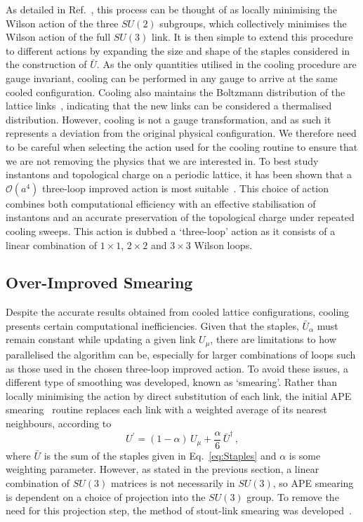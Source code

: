 As detailed in Ref.~\cite{Bonnet:2000dc}, this process can be thought of as locally minimising the Wilson action of the three $SU(2)$ subgroups, which collectively minimises the Wilson action of the full $SU(3)$ link. It is then simple to extend this procedure to different actions by expanding the size and shape of the staples considered in the construction of $\bar{U}$. As the only quantities utilised in the cooling procedure are gauge invariant, cooling can be performed in any gauge to arrive at the same cooled configuration. Cooling also maintains the Boltzmann distribution of the lattice links~\cite{Cabibbo:1982zn}, indicating that the new links can be considered a thermalised distribution. However, cooling is not a gauge transformation, and as such it represents a deviation from the original physical configuration. We therefore need to be careful when selecting the action used for the cooling routine to ensure that we are not removing the physics that we are interested in. To best study instantons and topological charge on a periodic lattice, it has been shown that a $\mathcal{O}(a^4)$ three-loop  improved action is most suitable~\cite{BilsonThompson:2002jk}. This choice of action combines both computational efficiency with an effective stabilisation of instantons and an accurate preservation of the topological charge under repeated cooling sweeps. This action is dubbed a `three-loop' action as it consists of a linear combination of $1\times 1$, $2\times 2$ and $3\times 3$ Wilson loops.

\subsection{Over-Improved Smearing}
Despite the accurate results obtained from cooled lattice configurations, cooling presents certain computational inefficiencies. Given that the staples, $\bar{U}_\alpha$ must remain constant while updating a given link $U_\mu$, there are limitations to how  parallelised the algorithm can be, especially for larger combinations of loops such as those used in the chosen three-loop improved action. To avoid these issues, a different type of smoothing was developed, known as `smearing'. Rather than locally minimising the action by direct substitution of each link, the initial APE smearing~\cite{Albanese:1987ds, Falcioni:1984ei} routine replaces each link with a weighted average of its nearest neighbours, according to
%
\begin{equation}
U^\prime = (1-\alpha)\,U_\mu + \frac{\alpha}{6}\,\bar{U}^\dagger\, ,
\end{equation}
%
where $\bar{U}$ is the sum of the staples given in Eq.~\ref{eq:Staples} and $\alpha$ is some weighting parameter. However, as stated in the previous section, a linear combination of $SU(3)$ matrices is not necessarily in $SU(3)$, so APE smearing is dependent on a choice of projection into the $SU(3)$ group. To remove the need for this projection step, the method of stout-link smearing was developed~\cite{Morningstar:2003gk}.\\

